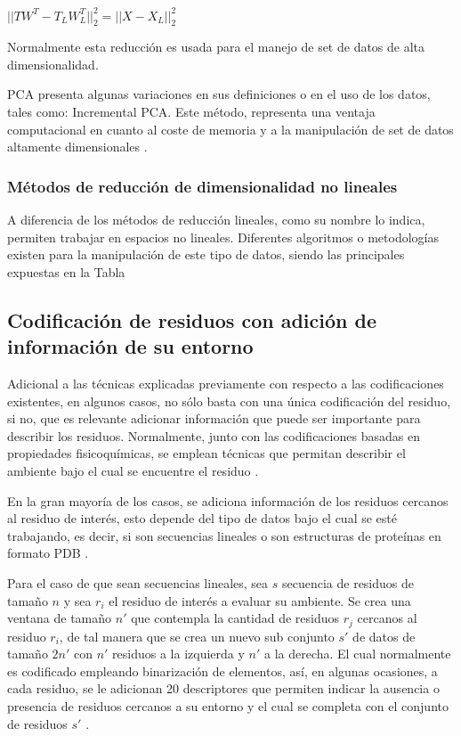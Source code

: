 \begin{center}
	$|| TW^{T} - T_{L}W_{L}^{T}||^{2}_{2} = ||X - X_{L}||_{2}^{2}$
\end{center}

Normalmente esta reducción es usada para el manejo de set de datos de alta dimensionalidad.

PCA presenta algunas variaciones en sus definiciones o en el uso de los datos, tales como: Incremental PCA. Este método, representa una ventaja computacional en cuanto al coste de memoria y a la manipulación de set de datos altamente dimensionales \cite{artac2002incremental}.


\subsubsection{Métodos de reducción de dimensionalidad no lineales}

A diferencia de los métodos de reducción lineales, como su nombre lo indica, permiten trabajar en espacios no lineales. Diferentes algoritmos o metodologías existen para la manipulación de este tipo de datos, siendo las principales expuestas en la Tabla



\subsection{Codificación de residuos con adición de información de su entorno}

Adicional a las técnicas explicadas previamente con respecto a las codificaciones existentes, en algunos casos, no sólo basta con una única codificación del residuo, si no, que es relevante adicionar información que puede ser importante para describir los residuos. Normalmente, junto con las codificaciones basadas en propiedades fisicoquímicas, se emplean técnicas que permitan describir el ambiente bajo el cual se encuentre el residuo \cite{masso2008accurate}.

En la gran mayoría de los casos, se adiciona información de los residuos cercanos al residuo de interés, esto depende del tipo de datos bajo el cual se esté trabajando, es decir, si son secuencias lineales o son estructuras de proteínas en formato PDB \cite{capriotti2008three, capriotti2005mutant2}. 

Para el caso de que sean secuencias lineales, sea $s$ secuencia de residuos de tamaño $n$ y sea $r_{i}$ el residuo de interés a evaluar su ambiente. Se crea una ventana de tamaño $n'$ que contempla la cantidad de residuos $r_j$ cercanos al residuo $r_{i}$, de tal manera que se crea un nuevo sub conjunto $s'$ de datos de tamaño $2n'$ con $n'$ residuos a la izquierda y $n'$ a la derecha. El cual normalmente es codificado empleando binarización de elementos, así, en algunas ocasiones, a cada residuo, se le adicionan 20 descriptores que permiten indicar la ausencia o presencia de residuos cercanos a su entorno y el cual se completa con el conjunto de residuos $s'$ \cite{capriotti2008three}.

